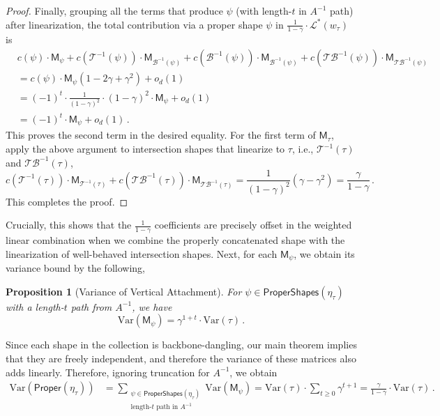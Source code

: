 \documentclass[12pt]{article}
\newcommand{\Var}{\mathrm{Var}}
\newtheorem{proposition}[theorem]{Proposition}
\newcommand{\calT}{\mathcal{T}}
\newcommand{\gam}{\gamma}
\newcommand{\cm}{\mathsf{M} }
\newcommand{\Authornote}[3]{{\sf\footnotesize\color{#3}{[#1: #2]}}}
\newcommand{\Authornote}[3]{}
\newcommand{\jnote}[1]{\Authornote{Jeff}{#1}{blue}}
\begin{document}
\begin{proof}
Finally, grouping all the terms that produce $\psi$ (with length-$t$ in $A^{-1}$ path) after linearization, the total contribution via a proper shape $\psi$ in $\frac{1}{1-\gamma} \cdot \mathcal{L}^{*}(w_\tau)$ is  
\begin{align*}
	&c(\psi) \cdot \cm_\psi + c(\mathcal{T}^{-1}(\psi)) \cdot \cm_{\mathcal{B}^{-1}(\psi)} + c(\mathcal{B}^{-1}(\psi)) \cdot \cm_{\mathcal{B}^{-1}(\psi)} +  c(\mathcal{TB}^{-1}(\psi))\cdot \cm_{\mathcal{TB}^{-1}(\psi)}\\
	&= c(\psi) \cdot \cm_\psi (1- 2\gam +\gam^2) +o_d(1)\\
	&= (-1)^t \cdot \frac{1}{(1-\gam)^2} \cdot (1-\gam)^2 \cdot \cm_\psi+ o_d(1)\\
	&= (-1)^t \cdot \cm_\psi +o_d(1)\,. 
\end{align*}
This proves the second term in the desired equality. For the first term of $\cm_\tau$, apply the above argument to intersection shapes that linearize to $\tau$, i.e., $\calT^{-1}(\tau)$ and $\mathcal{TB}^{-1}(\tau)$, \[
c(\calT^{-1}(\tau)) \cdot \cm_{\calT^{-1}(\tau)} + c(\mathcal{TB}^{-1}(\tau)) \cdot \cm_{\mathcal{TB}^{-1}(\tau)} = \frac{1}{(1-\gam)^2}  (\gam-\gam^2) = \frac{\gam}{1-\gam}\,.
 \]
This completes the proof.%
\end{proof}

Crucially, this shows that the $\frac{1}{1-\gamma}$ coefficients are precisely offset in the weighted linear combination when we combine the properly concatenated shape with the linearization of well-behaved intersection shapes.  Next, for each $\cm_\psi$, we obtain its variance bound by the following,
 \begin{proposition}[Variance of Vertical Attachment] \label{prop:variance-vertical-concate}  For $\psi\in \mathsf{Proper Shapes}(\eta_\tau)$ with a length-$t$ path from $A^{-1}$, we have 
 	\[
 	\Var( \cm_\psi ) = \gam^{1+t} \cdot \Var(\tau)\,. 
 	 \]
 \end{proposition}
 
 
 
 \jnote{this might require a proof}
 
 Since each shape in the collection is backbone-dangling, our main theorem implies that they are freely independent, and therefore the variance of these matrices also adds linearly. 
 Therefore, ignoring truncation for $A^{-1}$, we obtain \begin{align*}
	\Var(\mathsf{Proper}(\eta_\tau) )&= \sum_{\substack{\psi \in \mathsf{Proper Shapes}(\eta_\tau) \\ \text{length-$t$ path in } A^{-1} } }   \Var(\cm_\psi) 
	= \Var(\tau)\cdot   \sum_{t\geq 0} \gamma^{t+1}  
	=\frac{\gam }{1-\gamma} \cdot \Var(\tau) \,.
 \end{align*} 
\end{document}
